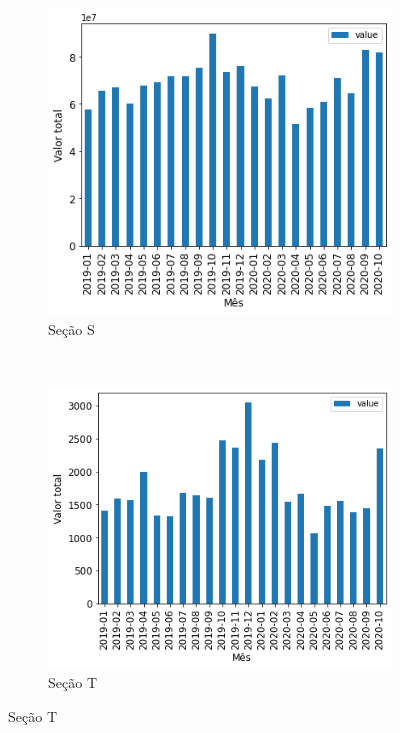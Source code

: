 \begin{figure}[htb] 
    \centering 
    \caption{Valor mensal transacionado por seção no período analisado (Parte 4)}
    \label{fig:pandemia:descritiva-16.4-valor-mensal-por-secao} 
    \begin{subfigure}[b]{0.45\textwidth}
        \includegraphics[scale=0.45]{images/base-de-dados-16.S-valor-mensal-por-secao.png}
        \caption{Seção S}
        \label{fig:pandemia:descritiva-16.S-valor-mensal-por-secao}
    \end{subfigure} ~ \quad
    \begin{subfigure}[b]{0.45\textwidth}
        \includegraphics[scale=0.45]{images/base-de-dados-16.T-valor-mensal-por-secao.png}
        \caption{Seção T}
        \label{fig:pandemia:descritiva-16.T-valor-mensal-por-secao}
    \end{subfigure}
    \fautor
\end{figure}

